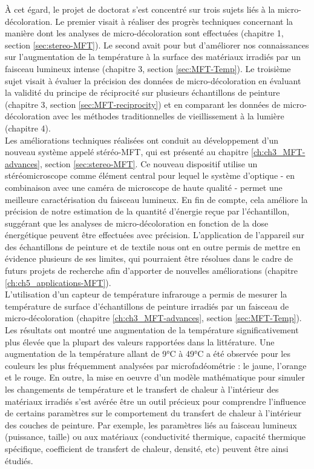 À cet égard, le projet de doctorat s'est concentré sur trois sujets liés à la micro-décoloration. Le premier visait à réaliser des progrès techniques concernant la manière dont les analyses de micro-décoloration sont effectuées (chapitre 1, section \ref{sec:stereo-MFT}). Le second avait pour but d'améliorer nos connaissances sur l'augmentation de la température à la surface des matériaux irradiés par un faisceau lumineux intense (chapitre 3, section \ref{sec:MFT-Temp}). Le troisième sujet visait à évaluer la précision des données de micro-décoloration en évaluant la validité du principe de réciprocité sur plusieurs échantillons de peinture (chapitre 3, section \ref{sec:MFT-reciprocity}) et en comparant les données de micro-décoloration avec les méthodes traditionnelles de vieillissement à la lumière (chapitre 4). \\

Les améliorations techniques réalisées ont conduit au développement d'un nouveau système appelé stéréo-MFT, qui est présenté au chapitre \ref{ch:ch3_MFT-advances}, section \ref{sec:stereo-MFT}. Ce nouveau dispositif utilise un stéréomicroscope comme élément central pour lequel le système d'optique - en combinaison avec une caméra de microscope de haute qualité - permet une meilleure caractérisation du faisceau lumineux. En fin de compte, cela améliore la précision de notre estimation de la quantité d'énergie reçue par l'échantillon, suggérant que les analyses de micro-décoloration en fonction de la dose énergétique peuvent être effectuées avec précision. L'application de l'appareil sur des échantillons de peinture et de textile nous ont en outre permis de mettre en évidence plusieurs de ses limites, qui pourraient être résolues dans le cadre de futurs projets de recherche afin d'apporter de nouvelles améliorations (chapitre \ref{ch:ch5_applications-MFT}). \\

L'utilisation d'un capteur de température infrarouge a permis de mesurer la température de surface d'échantillons de peinture irradiés par un faisceau de micro-décoloration (chapitre \ref{ch:ch3_MFT-advances}, section \ref{sec:MFT-Temp}). Les résultats ont montré une augmentation de la température significativement plus élevée que la plupart des valeurs rapportées dans la littérature. Une augmentation de la température allant de 9\unit{\degreeCelsius} à 49\unit{\degreeCelsius} a été observée pour les couleurs les plus fréquemment analysées par microfadéométrie : le jaune, l'orange et le rouge. En outre, la mise en oeuvre d'un modèle mathématique pour simuler les changements de température et le transfert de chaleur à l'intérieur des matériaux irradiés s'est avérée être un outil précieux pour comprendre l'influence de certains paramètres sur le comportement du transfert de chaleur à l'intérieur des couches de peinture. Par exemple, les paramètres liés au faisceau lumineux (puissance, taille) ou aux matériaux (conductivité thermique, capacité thermique spécifique, coefficient de transfert de chaleur, densité, etc) peuvent être ainsi étudiés.\\


